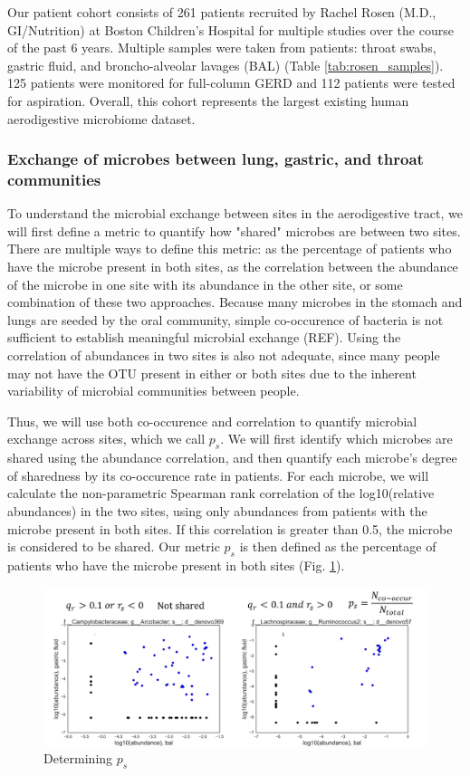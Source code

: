 \documentclass[12pt]{article}
\begin{document}
Our patient cohort consists of 261 patients recruited by Rachel Rosen (M.D., GI/Nutrition) at Boston Children's Hospital for multiple studies over the course of the past 6 years. Multiple samples were taken from patients: throat swabs, gastric fluid, and broncho-alveolar lavages (BAL) (Table \ref{tab:rosen_samples}). 125 patients were monitored for full-column GERD and 112 patients were tested for aspiration. Overall, this cohort represents the largest existing human aerodigestive microbiome dataset.


\subsubsection{Exchange of microbes between lung, gastric, and throat communities} \label{sec:exchange}
To understand the microbial exchange between sites in the aerodigestive tract, we will first define a metric to quantify how "shared" microbes are between two sites. There are multiple ways to define this metric: as the percentage of patients who have the microbe present in both sites, as the correlation between the abundance of the microbe in one site with its abundance in the other site, or some combination of these two approaches. Because many microbes in the stomach and lungs are seeded by the oral community, simple co-occurence of bacteria is not sufficient to establish meaningful microbial exchange (REF). Using the correlation of abundances in two sites is also not adequate, since many people may not have the OTU present in either or both sites due to the inherent variability of microbial communities between people.

Thus, we will use both co-occurence and correlation to quantify microbial exchange across sites, which we call $p_s$. We will first identify which microbes are shared using the abundance correlation, and then quantify each microbe's degree of sharedness by its co-occurence rate in patients. For each microbe, we will calculate the non-parametric Spearman rank correlation of the log10(relative abundances) in the two sites, using only abundances from patients with the microbe present in both sites. If this correlation is greater than 0.5, the microbe is considered to be shared. Our metric $p_s$ is then defined as the percentage of patients who have the microbe present in both sites (Fig. \ref{fig:sharedness_defn}).

\begin{figure}
	\centering
    \includegraphics[scale=0.5]{sharedness_definition}
    \caption{Determining $p_s$}\label{fig:sharedness_defn}
\end{figure}
\end{document}
